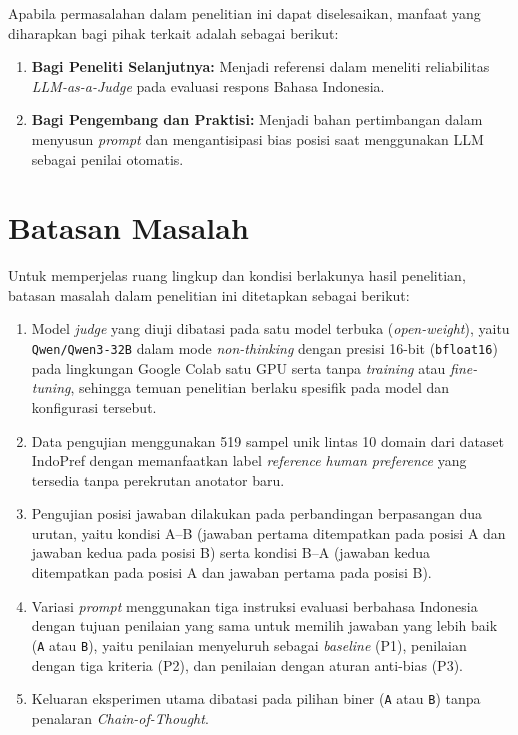 Apabila permasalahan dalam penelitian ini dapat diselesaikan, manfaat yang diharapkan bagi pihak terkait adalah sebagai berikut:
\begin{enumerate}
  \item \textbf{Bagi Peneliti Selanjutnya:} Menjadi referensi dalam meneliti reliabilitas \textit{LLM-as-a-Judge} pada evaluasi respons Bahasa Indonesia.
  \item \textbf{Bagi Pengembang dan Praktisi:} Menjadi bahan pertimbangan dalam menyusun \textit{prompt} dan mengantisipasi bias posisi saat menggunakan LLM sebagai penilai otomatis.
\end{enumerate}

\section{Batasan Masalah}

Untuk memperjelas ruang lingkup dan kondisi berlakunya hasil penelitian, batasan masalah dalam penelitian ini ditetapkan sebagai berikut:
\begin{enumerate}
  \item Model \textit{judge} yang diuji dibatasi pada satu model terbuka (\textit{open-weight}), yaitu \texttt{Qwen/Qwen3-32B} dalam mode \textit{non-thinking} dengan presisi 16-bit (\texttt{bfloat16}) pada lingkungan Google Colab satu GPU serta tanpa \textit{training} atau \textit{fine-tuning}, sehingga temuan penelitian berlaku spesifik pada model dan konfigurasi tersebut.
  \item Data pengujian menggunakan 519 sampel unik lintas 10 domain dari dataset IndoPref dengan memanfaatkan label \textit{reference human preference} yang tersedia tanpa perekrutan anotator baru.
  \item Pengujian posisi jawaban dilakukan pada perbandingan berpasangan dua urutan, yaitu kondisi A--B (jawaban pertama ditempatkan pada posisi A dan jawaban kedua pada posisi B) serta kondisi B--A (jawaban kedua ditempatkan pada posisi A dan jawaban pertama pada posisi B).
  \item Variasi \textit{prompt} menggunakan tiga instruksi evaluasi berbahasa Indonesia dengan tujuan penilaian yang sama untuk memilih jawaban yang lebih baik (\texttt{A} atau \texttt{B}), yaitu penilaian menyeluruh sebagai \textit{baseline} (P1), penilaian dengan tiga kriteria (P2), dan penilaian dengan aturan anti-bias (P3).
  \item Keluaran eksperimen utama dibatasi pada pilihan biner (\texttt{A} atau \texttt{B}) tanpa penalaran \textit{Chain-of-Thought}.
\end{enumerate}

